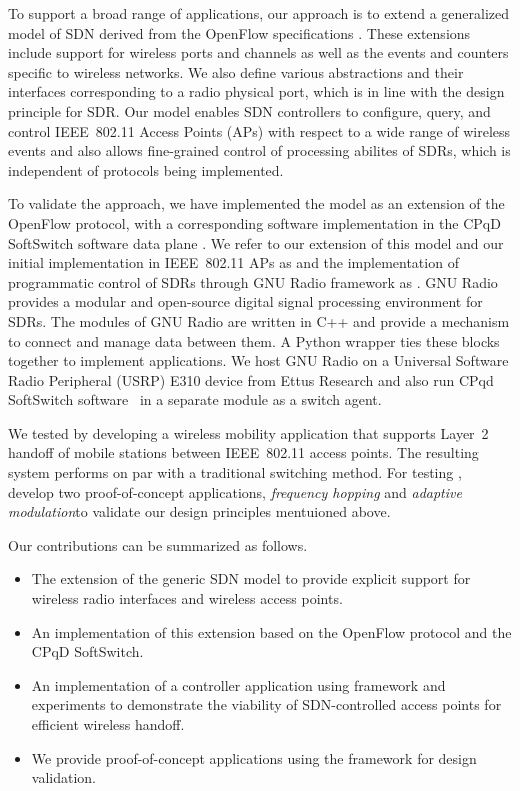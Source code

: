To support a broad range of applications, our approach is to extend a generalized model of SDN derived from the OpenFlow specifications \cite{Casey:14}.  These extensions include support for wireless ports and channels as well as the events and counters specific to wireless networks. We also define various abstractions and their interfaces corresponding to a radio physical port, which is in line with the design principle for SDR. Our model enables SDN controllers to configure, query, and control IEEE~802.11 Access Points (APs) with respect to a wide range of wireless events and also allows fine-grained control of processing abilites of SDRs, which is independent of protocols being implemented. 

To validate the approach, we have implemented the model as an extension of the OpenFlow protocol, with a corresponding software implementation in the CPqD SoftSwitch software data plane \cite{ofsoftswitch13}. We refer to our extension of this model and our initial implementation in IEEE~802.11 APs as {\em \aetherflow} and the implementation of programmatic control of SDRs through GNU Radio \cite{gnuradio} framework as {\em \crossflow}. GNU Radio provides a modular and open-source digital signal processing environment for SDRs. The modules of GNU Radio are written in C++ and provide a mechanism to connect and manage data between them. A Python wrapper ties these blocks together to implement applications. We host GNU Radio on a Universal Software Radio Peripheral (USRP) E310 device from Ettus Research and also run CPqd SoftSwitch software~\cite{ofsoftswitch13} in a separate module as a switch agent.

We tested {\em \aetherflow} by developing a wireless mobility application that supports Layer~2 handoff of mobile stations between IEEE~802.11 access points. The resulting system performs on par with a traditional switching method. For testing {\em \crossflow}, develop two proof-of-concept applications, \emph{frequency hopping} and \emph{adaptive modulation}to validate our design principles mentuioned above.

Our contributions can be summarized as follows.

\begin{itemize}
\item The extension of the generic SDN model to provide explicit support for wireless radio interfaces and wireless access points.

\item An implementation of this extension based on the OpenFlow protocol and the CPqD SoftSwitch.

\item An implementation of a controller application using \aetherflow framework and experiments to demonstrate the viability of SDN-controlled access points for
efficient wireless handoff.

\item We provide proof-of-concept  applications using the \crossflow framework for design validation.
\end{itemize}

